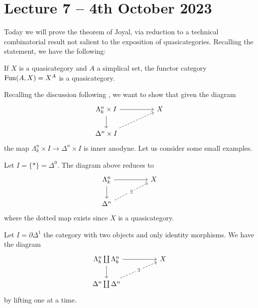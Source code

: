 \section{Lecture 7 -- 4th October 2023}
Today we will prove the theorem of Joyal,  via reduction to a technical combinatorial result not salient to the exposition of quasicategories. Recalling the statement, we have the following:
\begin{theorem}[Joyal; =\Cref{thm: Joyal on functor category of quasicategory and simplicial set}]
  If $X$ is a quasicategory and $A$ a simplical set, the functor category $\mathrm{Fun}(A,X)=X^{A}$ is a quasicategory. 
\end{theorem}
Recalling the discussion following , we want to show that given the diagram 
$$%
\begin{tikzcd}
	{\Lambda^{n}_{k}\times I} && X \\
	{\Delta^{n}\times I}
	\arrow[from=1-1, to=1-3]
	\arrow[from=1-1, to=2-1]
	\arrow[dashed, from=2-1, to=1-3]
\end{tikzcd}$$
the map $\Lambda^{n}_{k}\times I\to\Delta^{n}\times I$ is inner anodyne. Let us consider some small examples. 
\begin{example}
  Let $I=\{*\}=\Delta^{0}$. The diagram above reduces to 
  $$%
  \begin{tikzcd}
    {\Lambda^{n}_{k}} && X \\
    {\Delta^{n}}
    \arrow[from=1-1, to=1-3]
    \arrow[from=1-1, to=2-1]
    \arrow["\exists"{description}, dashed, from=2-1, to=1-3]
  \end{tikzcd}$$
  where the dotted map exists since $X$ is a quasicategory. 
\end{example}
\begin{example}\label{ex: lifting to boundary of one simplex}
  Let $I=\partial\Delta^{1}$ the category with two objects and only identity morphisms. We have the diagram 
  $$%
  \begin{tikzcd}
    {\Lambda^{n}_{k}\coprod\Lambda^{n}_{k}} && X \\
    {\Delta^{n}\coprod\Delta^{n}}
    \arrow[from=1-1, to=1-3]
    \arrow[from=1-1, to=2-1]
    \arrow["\exists"{description}, dashed, from=2-1, to=1-3]
  \end{tikzcd}$$
  by lifting one at a time. 
\end{example}

